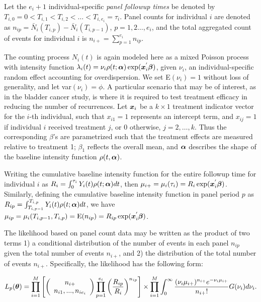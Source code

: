 \documentclass[12pt]{article}
\def \alph{\mbox{\boldmath $\alpha$ \unboldmath}\!\!}
\def \bet{\mbox{\boldmath $\beta$ \unboldmath}\!\!}
\def \thet{\mbox{\boldmath $\theta$ \unboldmath}\!\!}
\def \bx{\mbox{\boldmath $x$ \unboldmath}\!\!}
\begin{document}
Let the $e_i+1$ individual-specific {\it panel followup times} be denoted by $T_{i,0}=0<T_{i,1}<T_{i,2}< \ldots< T_{i,e_i}=\tau_i$. Panel counts for individual $i$ are denoted as $n_{ip}=\bar{N}_i(T_{i,p})-\bar{N}_i(T_{i,p-1})$,
$p=1, 2 \ldots, e_i$, and the total aggregated
count of events for individual $i$ is $n_{i+}=\sum^{e_i}_{p=1}
n_{ip}$. 

The counting process $N_{i}(t)$ is again modeled here as a mixed Poisson
process with intensity function $\lambda_{i}(t)=\nu_i\rho(t;\alph)\exp ( {\bx}_{i}^{'} \bet )$, given $\nu_i$, an individual-specific random effect accounting for overdispersion. We set  E$(\nu_{i})=1$
without loss of generality, and let var$(\nu_i)=\phi$. A particular scenario that may be of interest, as in the bladder cancer study, is where it is required to test treatment efficacy in reducing the number of recurrences. Let ${\bx}_{i}$ be a $k\times 1$ treatment indicator vector for the
$i$-th individual, such that $x_{i1}=1$ represents an intercept term, and
$x_{ij}=1$ if individual
$i$ received treatment $j$, or 0 otherwise, $j=2,\ldots,k$. Thus the corresponding $\beta$'s are parametrized such that the treatment effects are measured relative to treatment 1; $\beta_1$ reflects the overall mean, and $\alph$ describes the
shape of the baseline intensity function $\rho(t,\alph)$.  

Writing the cumulative baseline
intensity function for the entire followup time for individual $i$ as $R_{i}=  \int_{0}^{\tau_i}Y_i(t)\rho(t;\alph)dt$, then
$\mu_{i+} =\mu_i(\tau_i)=R_{i} \exp ( {\bx}_{i}^{'}\bet)$. Similarly, defining the cumulative baseline intensity function
in panel period $p$ as $R_{ip} =  \int_{T_{i,p-1}}^{T_{i,p}}Y_i(t)\rho(t;\alph)dt$, we have  $\mu_{ip}=\mu_{i}(T_{i,p-1},T_{i,p})=\mbox{E}(n_{ip}) =R_{ip} \exp ({\bx}_{i}^{'}\bet)$.


The likelihood based on panel count data may be written as the product of two terms 1) a conditional distribution of the number of events in each panel $n_{ip}$ given the total number of events $n_{i+}$, and 2) the distribution of the total number of events $n_{i+}$. Specifically, the likelihood has the following form: 

\begin{equation}
L_{p}(\thet)= \prod^M_{i=1} \left [  \left ( \begin{array}{c}
         n_{i+} \\
        n_{i1},...,n_{ie_i}  \end{array} \right )
        \prod^{e_i}_{p=1}  \left( \frac{R_{ip}}{R_{i}}\right)^{n_{ip}}     
\right ] \times \prod_{i=1}^{M}\int_{0}^{\infty} \frac{(\nu_{i}\mu_{i+})^{n_{i+}} e^{-\nu_{i}\mu_{i+}}} {n_{i+}!} G(\nu_{i}) d \nu_{i}.
\label{eq:likp}
\end{equation}
\end{document}
